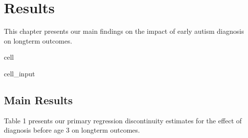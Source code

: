 \documentclass[letterpaper,10pt,english]{jupyterBook}
\begin{document}
\sphinxstepscope


\chapter{Results}
\label{\detokenize{results:results}}\label{\detokenize{results::doc}}
\sphinxAtStartPar
This chapter presents our main findings on the impact of early autism diagnosis on long\sphinxhyphen{}term outcomes.

\begin{sphinxuseclass}{cell}\begin{sphinxVerbatimInput}

\begin{sphinxuseclass}{cell_input}
\begin{sphinxVerbatim}[commandchars=\\\{\}]

  
  
\end{sphinxVerbatim}

\end{sphinxuseclass}\end{sphinxVerbatimInput}

\end{sphinxuseclass}

\section{Main Results}
\label{\detokenize{results:main-results}}
\sphinxAtStartPar
Table 1 presents our primary regression discontinuity estimates for the effect of diagnosis before age 3 on long\sphinxhyphen{}term outcomes.
\end{document}
